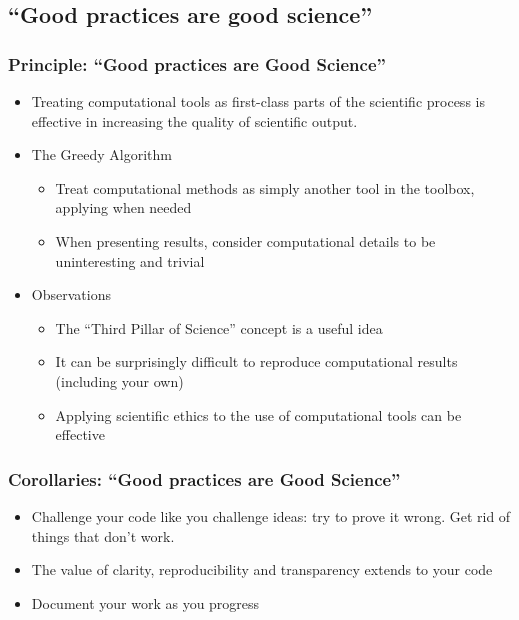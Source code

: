 \documentclass{beamer}
\begin{document}
\subsection{``Good practices are good science''}
\begin{frame}[fragile]
\frametitle{Principle: ``Good practices are Good Science''}
\begin{itemize}
  \item Treating computational tools as first-class parts of the scientific process is effective in increasing the quality of scientific output.
\item The Greedy Algorithm
\begin{itemize}
\item Treat computational methods as simply another tool in the toolbox, applying when needed
\item When presenting results, consider computational details to be uninteresting and trivial
\end{itemize}
\item Observations
\begin{itemize}
\item The ``Third Pillar of Science'' concept is a useful idea
\item It can be surprisingly difficult to reproduce computational results (including your own)
\item Applying scientific ethics to the use of computational tools can be effective
\end{itemize}
\end{itemize}
\end{frame}

\begin{frame}[fragile]
\frametitle{Corollaries: ``Good practices are Good Science''}
\begin{itemize}
\item Challenge your code like you challenge ideas: try to prove it wrong. Get rid of things that don't work.
\item The value of clarity, reproducibility and transparency extends to your code
\item Document your work as you progress
\end{itemize}
\end{frame}
\end{document}

